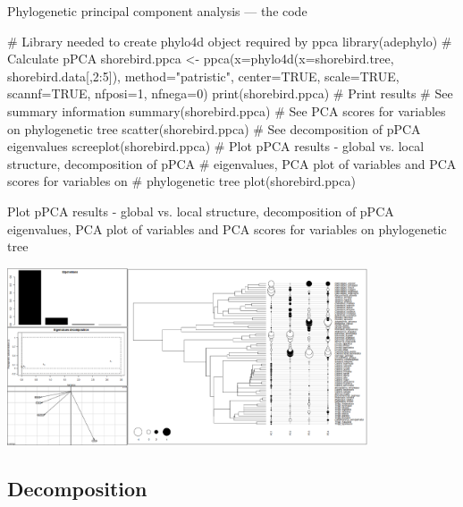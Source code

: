 \documentclass[compress, ucs, xelatex, 11pt, xcolor=svgnames, aspectratio=169,
	hyperref={
		bookmarks=true,
		unicode=true,
		colorlinks=true,
		pdftitle={Molecular data in R},
		plainpages=false,
		pdfauthor={Vojtech Zeisek},
		pdfsubject={Course about phylogeny and evolution in R},
		pdfcreator={XeLaTeX},
		pdfkeywords={R, evolution, phylogeny, molecular data},
		linkcolor=Crimson, %
		anchorcolor=Magenta, %
		citecolor=Magenta, %
		filecolor=Magenta, %
		menucolor=Magenta, %
		urlcolor=DodgerBlue, %
		pdftex},
	url={hyphens, lowtilde} %
	]{beamer}
\begin{document}
\begin{frame}[fragile]{Phylogenetic principal component analysis --- the code}
	\begin{spluscode}
    # Library needed to create phylo4d object required by ppca
    library(adephylo)
    # Calculate pPCA
    shorebird.ppca <- ppca(x=phylo4d(x=shorebird.tree, shorebird.data[,2:5]),
      method="patristic", center=TRUE, scale=TRUE, scannf=TRUE, nfposi=1,
      nfnega=0)
    print(shorebird.ppca) # Print results # See summary information
    summary(shorebird.ppca)
    # See PCA scores for variables on phylogenetic tree
    scatter(shorebird.ppca)
    # See decomposition of pPCA eigenvalues
    screeplot(shorebird.ppca)
    # Plot pPCA results - global vs. local structure, decomposition of pPCA
    # eigenvalues, PCA plot of variables and PCA scores for variables on
    # phylogenetic tree
    plot(shorebird.ppca)
	\end{spluscode}
\end{frame}

\begin{frame}{Plot pPCA results - global vs. local structure, decomposition of pPCA eigenvalues, PCA plot of variables and PCA scores for variables on phylogenetic tree}
	\begin{center}
		\includegraphics[height=5.25cm]{ppca.png}
	\end{center}
\end{frame}

\subsection{Decomposition}
\end{document}
